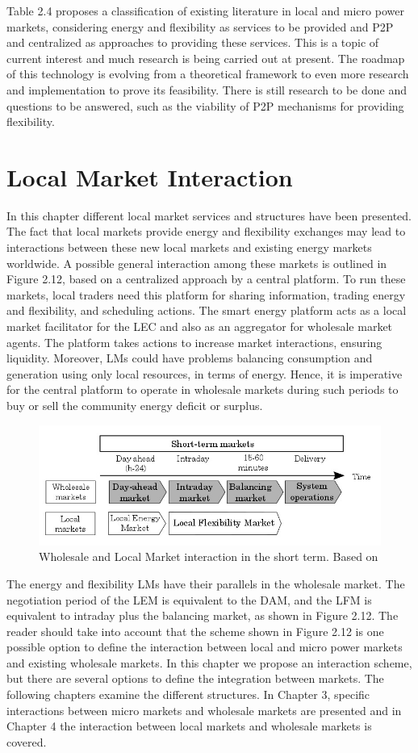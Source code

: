 Table 2.4 proposes a classification of existing literature in local and micro power markets, considering energy and flexibility as services to be provided and P2P and centralized as approaches to providing these services. This is a topic of current interest and much research is being carried out at present. The roadmap of this technology is evolving from a theoretical framework to even more research and implementation to prove its feasibility. There is still research to be done and questions to be answered, such as the viability of P2P mechanisms for providing flexibility.

\section{Local Market Interaction}
In this chapter different local market services and structures have been presented. The fact that local markets provide energy and flexibility exchanges may lead to interactions between these new local markets and existing energy markets worldwide. A possible general interaction among these markets is outlined in Figure 2.12, based on a centralized approach by a central platform. To run these markets, local traders need this platform for sharing information, trading energy and flexibility, and scheduling actions. The smart energy platform acts as a local market facilitator for the LEC and also as an aggregator for wholesale market agents. The platform takes actions to increase market interactions, ensuring liquidity. Moreover, LMs could have problems balancing consumption and generation using only local resources, in terms of energy. Hence, it is imperative for the central platform to operate in wholesale markets during such periods to buy or sell the community energy deficit or surplus.

\begin{figure}[]
	\centering
	\includegraphics[width=0.4\columnwidth ]{ChapterIntro/Figures/LM_WSM_Interaction.jpg}
		\caption{Wholesale and Local Market interaction in the short term. Based on \cite{InternationalEnergyAgency2016}}  
\end{figure}


The energy and flexibility LMs have their parallels in the wholesale market. The negotiation period of the LEM is equivalent to the DAM, and the LFM is equivalent to intraday plus the balancing market, as shown in Figure 2.12. The reader should take into account that the scheme shown in Figure 2.12 is one possible option to define the interaction between local and micro power markets and existing wholesale markets. In this chapter we propose an interaction scheme, but there are several options to define the integration between markets. The following chapters examine the different structures. In Chapter 3, specific interactions between micro markets
and wholesale markets are presented and in Chapter 4 the interaction between local markets and wholesale
markets is covered.

